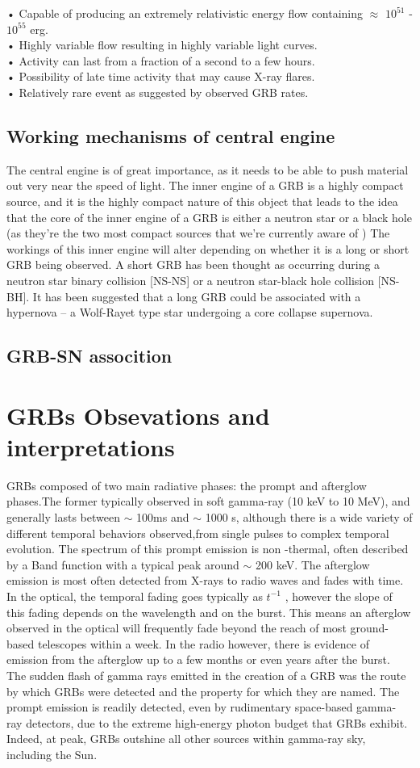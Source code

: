 • Capable of producing an extremely relativistic energy flow containing $\approx$ $ 10^{51} $ - $ 10^{55} $ erg.\\
• Highly variable flow resulting in highly variable light curves.\\
• Activity can last from a fraction of a second to a few hours.\\
• Possibility of late time activity that may cause X-ray flares.\\
• Relatively rare event as suggested by observed GRB rates.\\
\subsection{Working mechanisms of central engine}
The central  engine is of great importance, as it needs to be able to push material out very near the speed of light. The inner engine of a GRB is a highly compact source, and it is the highly compact nature of this object that leads to the idea that the core of the inner engine of a GRB is either a neutron star or a black hole (as they're the two most compact sources that we're currently aware of )
The workings of this inner engine will alter depending on whether it is a long or short GRB being observed. A short GRB has been thought as occurring during a neutron star binary collision [NS-NS] or a neutron star-black hole collision [NS-BH]. It has been suggested that a long GRB could be associated with a hypernova -- a Wolf-Rayet type star undergoing a core collapse supernova.\citep{21}
\subsection{GRB-SN assocition}
\section{GRBs Obsevations and interpretations }
GRBs composed of two main radiative phases: the prompt and afterglow phases.The
former typically observed in soft gamma-ray (10 keV to 10 MeV), and generally
lasts between $ \sim $ 100ms and $ \sim $ 1000 s, although there is a wide variety of different temporal behaviors observed,from single pulses to complex temporal evolution. The spectrum of this prompt emission is non -thermal, often described by a Band function with a typical peak around $ \sim $ 200 keV.
The afterglow emission is most often detected from X-rays to radio waves and fades
with time. In the optical, the temporal fading goes typically as $ t^{-1} $ , however the slope of this fading depends on the wavelength and on the burst. This means an
afterglow observed in the optical will frequently fade beyond the reach of most
ground-based telescopes within a week. In the radio however, there is evidence of
emission from the afterglow up to a few months or even years after the burst.
The sudden flash of gamma rays emitted in the creation of a GRB was the route
by which GRBs were detected and the property for which they are named. The
prompt emission is readily detected, even by rudimentary space-based gamma-
ray detectors, due to the extreme high-energy photon budget that GRBs exhibit.
Indeed, at peak, GRBs outshine all other sources within gamma-ray sky, including
the Sun.\citep{18}\\
